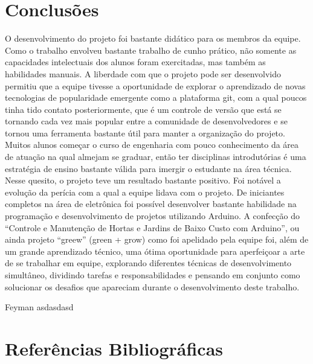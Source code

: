 \documentclass[a4paper,12pt]{article}
\begin{document}
\section{Conclusões}
O desenvolvimento do projeto foi bastante didático para os membros da equipe. Como o trabalho envolveu bastante trabalho de cunho prático, não somente as capacidades intelectuais dos alunos foram exercitadas, mas também as habilidades manuais. A liberdade com que o projeto pode ser desenvolvido permitiu que a equipe tivesse a oportunidade de explorar o aprendizado de novas tecnologias de popularidade emergente como a plataforma git, com a qual poucos tinha tido contato posteriormente, que é um controle de versão que está se tornando cada vez mais popular entre a comunidade de desenvolvedores e se tornou uma ferramenta bastante útil para manter a organização do projeto.
Muitos alunos começar o curso de engenharia com pouco conhecimento da área de atuação na qual almejam se graduar, então ter disciplinas introdutórias é uma estratégia de ensino bastante válida para imergir o estudante na área técnica. Nesse quesito, o projeto teve um resultado bastante positivo. Foi notável a evolução da perícia com a qual a equipe lidava com o projeto. De iniciantes completos na área de eletrônica foi possível desenvolver bastante habilidade na programação e desenvolvimento de projetos utilizando Arduino.
A confecção do “Controle e Manutenção de Hortas e Jardins de Baixo Custo com Arduino”, ou ainda projeto “greew” (green + grow) como foi apelidado pela equipe foi, além de um grande aprendizado técnico, uma ótima oportunidade para aperfeiçoar a arte de se trabalhar em equipe, explorando diferentes técnicas de desenvolvimento simultâneo, dividindo tarefas e responsabilidades e pensando em conjunto como solucionar os desafios que apareciam durante o desenvolvimento deste trabalho.


Feyman asdasdasd \cite{altieri1}
%
\renewcommand\refname{}


\newpage
\section{Referências Bibliográficas}
\renewcommand\refname{}

%
%
\end{document}

